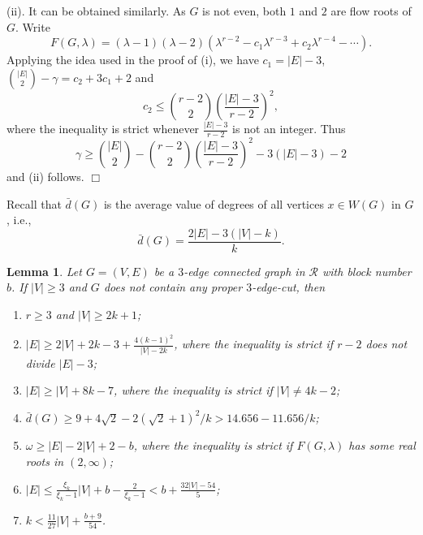 \documentclass[11pt]{article}
\newtheorem{lem}{Lemma}
\newcommand {\red} {\textcolor{red}}
\newcommand{\proofend}{{\hfill$\Box$}}
\def \setgr {\mathscr{R}}
\newcommand{\beeq}{\begin{equation}}
\newcommand{\eneq}{\end{equation}}
\newcommand {\relabel}[1] {\label{#1} \red{[*: #1]}}\newcommand {\rebibitem}[1] {\bibitem{#1} \red{[*: #1]}}%
\def\relabel {\label} \def\rebibitem {\bibitem}  %
\begin{document}
(ii). It can be obtained similarly.  
As $G$ is not even, both $1$ and $2$ are flow roots of $G$.
Write 
\beeq\relabel{le-eq4}
F(G,\lambda)
=(\lambda -1)(\lambda -2)(\lambda^{r-2}-c_1\lambda^{r-3}
+c_2\lambda^{r-4}-\cdots).
\eneq
Applying the idea used in the proof of (i), we have 
$c_1=|E|-3$, ${|E|\choose 2}-\gamma=c_2+3c_1+2$ 
and 
$$
c_2\le {r-2\choose 2}\left (\frac{|E|-3}{r-2} \right )^2,
$$
where the inequality is strict whenever $\frac{|E|-3}{r-2}$ 
is not an integer. Thus
$$
\gamma\ge {|E|\choose 2}-{r-2\choose 2} 
\left (\frac{|E|-3}{r-2}\right )^2-3(|E|-3)-2
$$
and (ii) follows. 
\proofend

Recall that 
$\bar d(G)$ is the average value of degrees 
of all vertices $x\in W(G)$ in $G$,  i.e., 
$$
\bar d(G)=\frac{2|E|-3(|V|-k)}k.
$$


\begin{lem} \relabel{main-lem30}
Let $G=(V,E)$ be a $3$-edge connected graph in 
$\setgr$ with block number $b$. 
If $|V|\ge 3$ and $G$ does not contain any proper $3$-edge-cut, 
then  
\begin{enumerate}
\item  \relabel{lem30-no1} $r\ge 3$ and $|V|\ge 2k+1$;
\item \relabel{lem30-no2}
$|E|\ge 2|V|+2k-3+\frac{4(k-1)^2}{|V|-2k}$, 
where the inequality is strict if $r-2$ does not divide 
$|E|-3$; 
\item \relabel{lem30-no3} 
$|E|\ge |V|+8k-7$, 
where the inequality is strict 
if $|V|\ne 4k-2$;
\item \relabel{lem30-no4} $\bar d(G)\ge 
9+4\sqrt 2-2(\sqrt 2+1)^2/k
>14.656-11.656/k$;
\item \relabel{lem30-no5} $\omega\ge |E|-2|V|+2-b$,
where  
the inequality is strict if 
$F(G,\lambda)$ has some real roots in $(2,\infty)$;
\item \relabel{lem30-no6}  
$|E|\le \frac{\xi_k}{\xi_k-1} |V|+b-\frac{2}{\xi_k-1}
<b+\frac{32|V|-54}{5}$;
\item \relabel{cor1-no1} 
$k< \frac {11}{27}|V|+\frac{b+9}{54}$.
\end{enumerate}
\end{lem}
\end{document}
